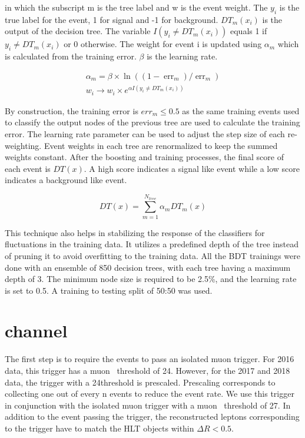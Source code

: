 in which the subscript m is the tree label and w is the event weight. The $y_{i}$ is the true label for the event, 1 for signal and -1 for background. $DT_{m}(x_{i})$ is the output of the decision tree. The variable $I(y_{i} \neq DT_{m}(x_{i}))$ equals 1 if $y_{i} \neq DT_{m}(x_{i})$ or 0 otherwise. The weight for event i is updated using $\alpha_{m}$ which is calculated from the training error. $\beta$ is the learning rate.

\begin{align}
  \alpha_{m}=\beta \times \ln \left(\left(1-\operatorname{err}_{m}\right) / \operatorname{err}_{m}\right) \\
  w_{i} \rightarrow w_{i} \times e^{\alpha I\left(y_{i} \neq DT_{m}\left(x_{i}\right)\right)}
\end{align}

By construction, the training error is $err_{m} \leq 0.5$ as the same training events used to classify the output nodes of the previous tree are used to calculate the training error. The learning rate parameter can be used to adjust the step size of each re-weighting. Event weights in each tree are renormalized to keep the summed weights constant. After the boosting and training processes, the final score of each event is $DT(x)$. A high score indicates a signal like event while a low score indicates a background like event.

\begin{equation}
DT(x)=\sum_{m=1}^{N_{tree}} \alpha_{m} DT_{m}(x)
\end{equation}

This technique also helps in stabilizing the response of the classifiers for fluctuations in the training data. It utilizes a predefined depth of the tree instead of pruning it to avoid overfitting to the training data. All the BDT trainings were done with an ensemble of 850 decision trees, with each tree having a maximum depth of 3. The minimum node size is required to be 2.5\%, and the learning rate is set to 0.5. A training to testing split of 50:50 was used.

\section{\texorpdfstring{\Hmuhad}{Hmutauh} channel}
The first step is to require the events to pass an isolated muon trigger. For 2016 data, this trigger has a muon \pt\, threshold of 24\GeV. However, for the 2017 and 2018 data, the trigger with a 24\GeV threshold is prescaled.  Prescaling corresponds to collecting one out of every n events to reduce the event rate. We use this trigger in conjunction with the isolated muon trigger with a muon \pt\, threshold of 27\GeV. In addition to the event passing the trigger, the reconstructed leptons corresponding to the trigger have to match the HLT objects within $\Delta R < 0.5$.

